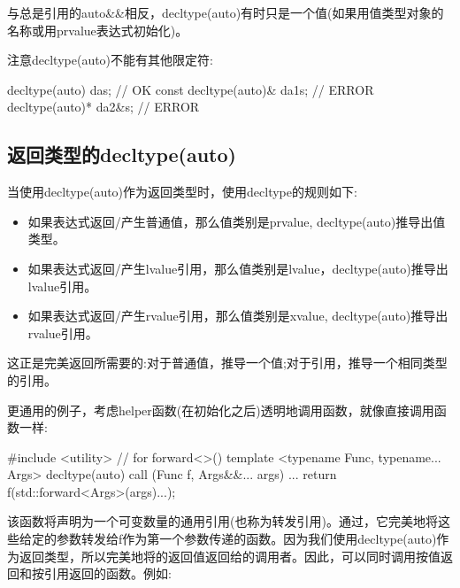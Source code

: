 与总是引用的auto\&\&相反，decltype(auto)有时只是一个值(如果用值类型对象的名称或用prvalue表达式初始化)。

注意decltype(auto)不能有其他限定符:

\begin{cppcode}
decltype(auto) da{s}; // OK
const decltype(auto)& da1{s}; // ERROR
decltype(auto)* da2{&s}; // ERROR
\end{cppcode}

\subsection{返回类型的decltype(auto)}

当使用decltype(auto)作为返回类型时，使用decltype的规则如下:

\begin{itemize}
	\item 如果表达式返回/产生普通值，那么值类别是prvalue, decltype(auto)推导出值类型。
	\item 如果表达式返回/产生lvalue引用，那么值类别是lvalue，decltype(auto)推导出lvalue引用。
	\item 如果表达式返回/产生rvalue引用，那么值类别是xvalue, decltype(auto)推导出rvalue引用。
\end{itemize}

这正是完美返回所需要的:对于普通值，推导一个值;对于引用，推导一个相同类型的引用。

更通用的例子，考虑helper函数(在初始化之后)透明地调用函数，就像直接调用函数一样:

\begin{cppcode}
#include <utility> // for forward<>()
template <typename Func, typename... Args>
decltype(auto) call (Func f, Args&&... args)
{
	...
	return f(std::forward<Args>(args)...);
}
\end{cppcode}

该函数将声明为一个可变数量的通用引用(也称为转发引用)。通过，它完美地将这些给定的参数转发给f作为第一个参数传递的函数。因为我们使用decltype(auto)作为返回类型，所以完美地将的返回值返回给的调用者。因此，可以同时调用按值返回和按引用返回的函数。例如:

